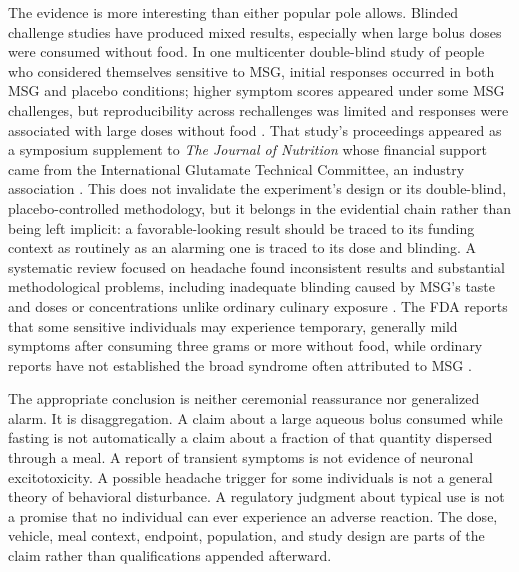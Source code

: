 \documentclass[11pt]{article}
\begin{document}
The evidence is more interesting than either popular pole allows. Blinded challenge studies have produced mixed results, especially when large bolus doses were consumed without food. In one multicenter double-blind study of people who considered themselves sensitive to MSG, initial responses occurred in both MSG and placebo conditions; higher symptom scores appeared under some MSG challenges, but reproducibility across rechallenges was limited and responses were associated with large doses without food 
\citep{geha2000multicenter}. That study's proceedings appeared as a symposium supplement to \emph{The Journal of Nutrition} whose financial support came from the International Glutamate Technical Committee, an industry association \citep{geha2000multicenter}. This does not invalidate the experiment's design or its double-blind, placebo-controlled methodology, but it belongs in the evidential chain rather than being left implicit: a favorable-looking result should be traced to its funding context as routinely as an alarming one is traced to its dose and blinding. A systematic review focused on headache found inconsistent results and substantial methodological problems, including inadequate blinding caused by MSG's taste and doses or concentrations unlike ordinary culinary exposure 
\citep{obayashi2016headache}. The FDA reports that some sensitive individuals may experience temporary, generally mild symptoms after consuming three grams or more without food, while ordinary reports have not established the broad syndrome often attributed to MSG 
\citep{fda2012msg}.

The appropriate conclusion is neither ceremonial reassurance nor generalized alarm. It is disaggregation. A claim about a large aqueous bolus consumed while fasting is not automatically a claim about a fraction of that quantity dispersed through a meal. A report of transient symptoms is not evidence of neuronal excitotoxicity. A possible headache trigger for some individuals is not a general theory of behavioral disturbance. A regulatory judgment about typical use is not a promise that no individual can ever experience an adverse reaction. The dose, vehicle, meal context, endpoint, population, and study design are parts of the claim rather than qualifications appended afterward.
\end{document}
